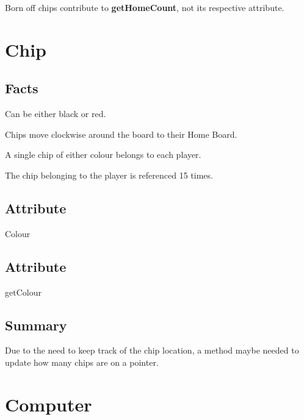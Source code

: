\documentclass{report}
\begin{document}
    \begin{dashed}
        \item Born off chips contribute to \textbf{getHomeCount}, not its respective attribute.
    \end{dashed}




    \newpage
    \section{Chip}

    \subsection{Facts}
    \begin{dashed}
        \item Can be either black or red.
        \item Chips move clockwise around the board to their Home Board.
        \item A single chip of either colour belongs to each player.
        \item The chip belonging to the player is referenced 15 times.
    \end{dashed}

    \subsection{Attribute}
    \begin{dashed}
        \item Colour
    \end{dashed}

    \subsection{Attribute}
    \begin{dashed}
        \item getColour
    \end{dashed}

    \subsection{Summary}
    Due to the need to keep track of the chip location, a method maybe needed to update how many chips
    are on a pointer.






    \newpage
    \section{Computer}
\end{document}
